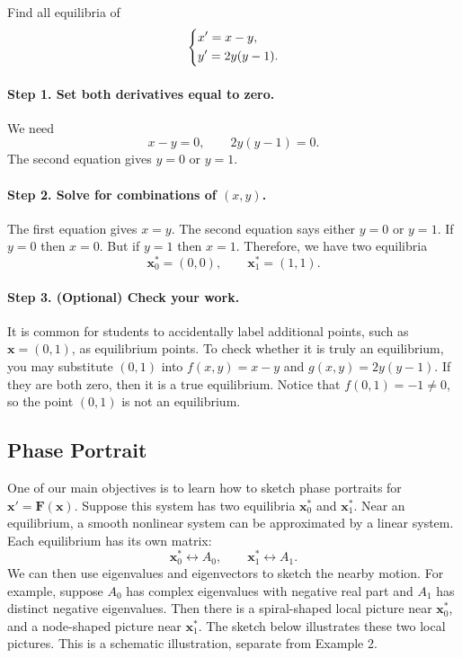 \documentclass[10pt,letterpaper]{article}
\begin{document}
\begin{example}[2]{
Find all equilibria of
\[
\begin{dcases}
x'=x-y,\\
y'=2y(y-1).
\end{dcases}
\]
}
\paragraph{Step 1. Set both derivatives equal to zero.}
We need
\[
x-y=0,\qquad 2y(y-1)=0.
\]
The second equation gives $y=0$ or $y=1$.

\paragraph{Step 2. Solve for combinations of $(x,y)$.}
The first equation gives $x=y$. The second equation says either $y=0$ or $y=1$. If $y=0$ then $x=0$. But if $y=1$ then $x=1$. Therefore, we have two equilibria
\[
\boxed{\mathbf{x}_0^*=(0,0),\qquad \mathbf{x}_1^*=(1,1).}
\]
\paragraph{Step 3. (Optional) Check your work.}
It is common for students to accidentally label additional points, such as $\textbf{x}=(0,1)$, as equilibrium points. To check whether it is truly an equilibrium, you may substitute $(0,1)$ into $f(x,y)=x-y$ and $g(x,y)=2y(y-1)$. If they are both zero, then it is a true equilibrium. Notice that $f(0,1)=-1\ne0$, so the point $(0,1)$ is not an equilibrium.

\end{example}


\subsection{Phase Portrait}

One of our main objectives is to learn how to sketch phase portraits for $\textbf{x}'=\textbf{F}(\textbf{x})$.  Suppose this system has two equilibria $\textbf{x}^*_0$ and $\textbf{x}^*_1$. Near an equilibrium, a smooth nonlinear system can be approximated by a linear system. Each equilibrium has its own matrix:
\[
\mathbf{x}_0^*\longleftrightarrow A_0,
\qquad
\mathbf{x}_1^*\longleftrightarrow A_1.
\]
We can then use eigenvalues and eigenvectors to sketch the nearby motion. For example, suppose $A_0$ has complex eigenvalues with negative real part and $A_1$ has distinct negative eigenvalues. Then there is a spiral-shaped local picture near $\textbf{x}^*_0$, and a node-shaped picture near $\textbf{x}^*_1$. The sketch below illustrates these two local pictures. This is a schematic illustration, separate from Example 2.
\end{document}
